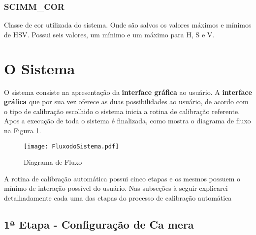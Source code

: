 \subsubsection{SCIMM\_COR}
	Classe de cor utilizada do sistema. Onde são salvos os valores máximos e mínimos de HSV. Possui seis valores, um mínimo e um máximo para H, S e V. 


\section{O Sistema}

		 O sistema consiste na apresentação da \textbf{interface gráfica} ao usuário. A \textbf{interface gráfica} que por sua vez oferece as duas possibilidades ao usuário, de acordo com o tipo de calibração escolhido o sistema inicia a rotina de calibração referente. Apos a execução de toda o sistema é finalizada, como mostra o diagrama de fluxo na Figura \ref{FlowCHart}.
		
		\begin{figure}[H]
			\centering
			\texttt{[image: FluxodoSistema.pdf]}
			\caption{Diagrama de Fluxo}
			\label{FlowCHart}
		\end{figure}			
	 
		A rotina de calibração automática possui cinco etapas e os mesmos possuem o mínimo de interação possível do usuário. Nas subseções à seguir explicarei detalhadamente cada uma das etapas do processo de calibração automática
		\subsection{1ª Etapa - Configuração de Ca mera}
		

